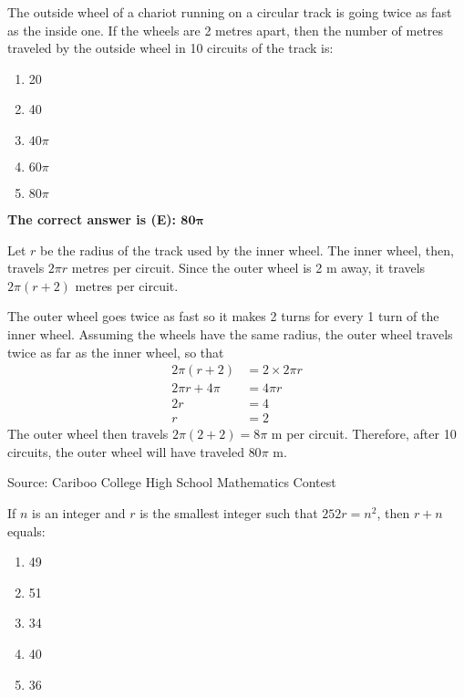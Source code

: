 \documentclass{article}
\begin{document}
\normalsize
The outside wheel of a chariot running on a circular track is going twice as fast as the inside one. If the wheels are 2 metres apart, then the number of metres traveled by the outside wheel in 10 circuits of the track is:
\begin{enumerate}[noitemsep,topsep=0mm,leftmargin=*,widest=D,label=\Alph*)]
	\item 20
	\item 40
	\item $40\pi$
	\item $60\pi$
	\item $80\pi$
\end{enumerate}

\textbf{The correct answer is (E): $\mathbf{80\pi}$}

Let $r$ be the radius of the track used by the inner wheel. The inner wheel, then, travels $2\pi r$ metres per circuit. Since the outer wheel is 2 m away, it travels $2\pi(r+2)$ metres per circuit.

The outer wheel goes twice as fast so it makes 2 turns for every 1 turn of the inner wheel. Assuming the wheels have the same radius, the outer wheel travels twice as far as the inner wheel, so that
\begin{align*}
2\pi (r+2) &= 2\times 2\pi r\\
2\pi r + 4\pi &= 4\pi r\\
2r &= 4\\
r &= 2
\end{align*}
The outer wheel then travels $2\pi(2+2) = 8\pi$ m per circuit. Therefore, after 10 circuits, the outer wheel will have traveled $80\pi$ m.

\vskip 1.5cm


\scriptsize
Source: Cariboo College High School Mathematics Contest

\normalsize
If $n$ is an integer and $r$ is the smallest integer such that $252r = n^2$, then $r+n$ equals:
\begin{enumerate}[noitemsep,topsep=0mm,leftmargin=*,widest=D,label=\Alph*)]
	\item 49
	\item 51
	\item 34
	\item 40
	\item 36
\end{enumerate}
\end{document}
